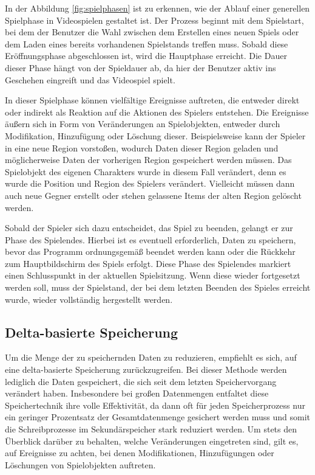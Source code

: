 In der Abbildung \ref{fig:spielphasen} ist zu erkennen, wie der Ablauf einer generellen Spielphase in Videospielen gestaltet ist. Der Prozess beginnt mit dem Spielstart, bei dem der Benutzer die Wahl zwischen dem Erstellen eines neuen Spiels oder dem Laden eines bereits vorhandenen Spielstands treffen muss. Sobald diese Eröffnungsphase abgeschlossen ist, wird die Hauptphase erreicht. Die Dauer dieser Phase hängt von der Spieldauer ab, da hier der Benutzer aktiv ins Geschehen eingreift und das Videospiel spielt.

In dieser Spielphase können vielfältige Ereignisse auftreten, die entweder direkt oder indirekt als Reaktion auf die Aktionen des Spielers entstehen. Die Ereignisse äußern sich in Form von Veränderungen an Spielobjekten, entweder durch Modifikation, Hinzufügung oder Löschung dieser. Beispielsweise kann der Spieler in eine neue Region vorstoßen, wodurch Daten dieser Region geladen und möglicherweise Daten der vorherigen Region gespeichert werden müssen. Das Spielobjekt des eigenen Charakters wurde in diesem Fall verändert, denn es wurde die Position und Region des Spielers verändert. Vielleicht müssen dann auch neue Gegner erstellt oder stehen gelassene Items der alten Region gelöscht werden. 

Sobald der Spieler sich dazu entscheidet, das Spiel zu beenden, gelangt er zur Phase des Spielendes. Hierbei ist es eventuell erforderlich, Daten zu speichern, bevor das Programm ordnungsgemäß beendet werden kann oder die Rückkehr zum Hauptbildschirm des Spiels erfolgt. Diese Phase des Spielendes markiert einen Schlusspunkt in der aktuellen Spielsitzung. Wenn diese wieder fortgesetzt werden soll, muss der Spielstand, der bei dem letzten Beenden des Spieles erreicht wurde, wieder vollständig hergestellt werden. 


\subsection{Delta-basierte Speicherung} \label{ssect:deltasave}
Um die Menge der zu speichernden Daten zu reduzieren, empfiehlt es sich, auf eine delta-basierte Speicherung zurückzugreifen. Bei dieser Methode werden lediglich die Daten gespeichert, die sich seit dem letzten Speichervorgang verändert haben. Insbesondere bei großen Datenmengen entfaltet diese Speichertechnik ihre volle Effektivität, da dann oft für jeden Speicherprozess nur ein geringer Prozentsatz der Gesamtdatenmenge gesichert werden muss und somit die Schreibprozesse im Sekundärspeicher stark reduziert werden. Um stets den Überblick darüber zu behalten, welche Veränderungen eingetreten sind, gilt es, auf Ereignisse zu achten, bei denen Modifikationen, Hinzufügungen oder Löschungen von Spielobjekten auftreten.

